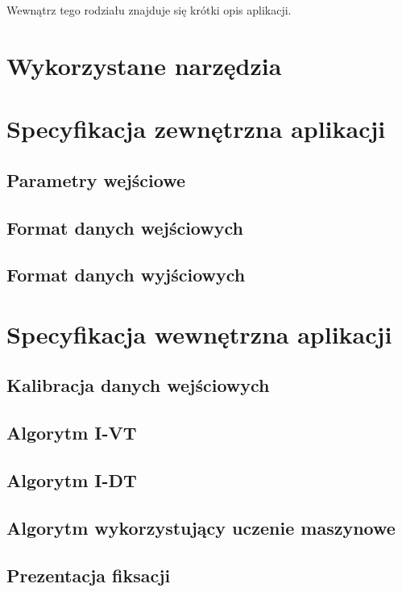 Wewnątrz tego rodziału znajduje się krótki opis aplikacji.
\section{Wykorzystane narzędzia}
\label{sec:calibration}
\section{Specyfikacja zewnętrzna aplikacji}
\subsection{Parametry wejściowe}
\subsection{Format danych wejściowych}
\subsection{Format danych wyjściowych}
\section{Specyfikacja wewnętrzna aplikacji}
\subsection{Kalibracja danych wejściowych}
\subsection{Algorytm I-VT}
\subsection{Algorytm I-DT}
\subsection{Algorytm wykorzystujący uczenie maszynowe}
\subsection{Prezentacja fiksacji}
\label{ssec:machinelearningalg}
